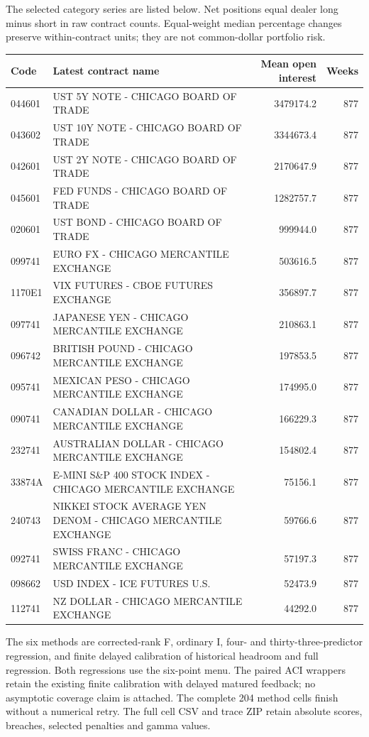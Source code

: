 \documentclass[10pt,a4paper]{article}
\begin{document}
The selected category series are listed below. Net positions equal dealer long minus short in raw contract counts. Equal-weight median percentage changes preserve within-contract units; they are not common-dollar portfolio risk.
\begin{center}\scriptsize\begin{longtable}{lp{7.1cm}rr}
\toprule Code & Latest contract name & Mean open interest & Weeks \\\midrule\endhead
044601 & UST 5Y NOTE - CHICAGO BOARD OF TRADE & 3479174.2 & 877 \\
043602 & UST 10Y NOTE - CHICAGO BOARD OF TRADE & 3344673.4 & 877 \\
042601 & UST 2Y NOTE - CHICAGO BOARD OF TRADE & 2170647.9 & 877 \\
045601 & FED FUNDS - CHICAGO BOARD OF TRADE & 1282757.7 & 877 \\
020601 & UST BOND - CHICAGO BOARD OF TRADE & 999944.0 & 877 \\
099741 & EURO FX - CHICAGO MERCANTILE EXCHANGE & 503616.5 & 877 \\
1170E1 & VIX FUTURES - CBOE FUTURES EXCHANGE & 356897.7 & 877 \\
097741 & JAPANESE YEN - CHICAGO MERCANTILE EXCHANGE & 210863.1 & 877 \\
096742 & BRITISH POUND - CHICAGO MERCANTILE EXCHANGE & 197853.5 & 877 \\
095741 & MEXICAN PESO - CHICAGO MERCANTILE EXCHANGE & 174995.0 & 877 \\
090741 & CANADIAN DOLLAR - CHICAGO MERCANTILE EXCHANGE & 166229.3 & 877 \\
232741 & AUSTRALIAN DOLLAR - CHICAGO MERCANTILE EXCHANGE & 154802.4 & 877 \\
33874A & E-MINI S\&P 400 STOCK INDEX - CHICAGO MERCANTILE EXCHANGE & 75156.1 & 877 \\
240743 & NIKKEI STOCK AVERAGE YEN DENOM - CHICAGO MERCANTILE EXCHANGE & 59766.6 & 877 \\
092741 & SWISS FRANC - CHICAGO MERCANTILE EXCHANGE & 57197.3 & 877 \\
098662 & USD INDEX - ICE FUTURES U.S. & 52473.9 & 877 \\
112741 & NZ DOLLAR - CHICAGO MERCANTILE EXCHANGE & 44292.0 & 877 \\
\bottomrule\end{longtable}\end{center}

The six methods are corrected-rank F, ordinary I, four- and thirty-three-predictor regression, and finite delayed calibration of historical headroom and full regression. Both regressions use the six-point menu. The paired ACI wrappers retain the existing finite calibration with delayed matured feedback; no asymptotic coverage claim is attached. The complete 204 method cells finish without a numerical retry. The full cell CSV and trace ZIP retain absolute scores, breaches, selected penalties and gamma values.
\end{document}
